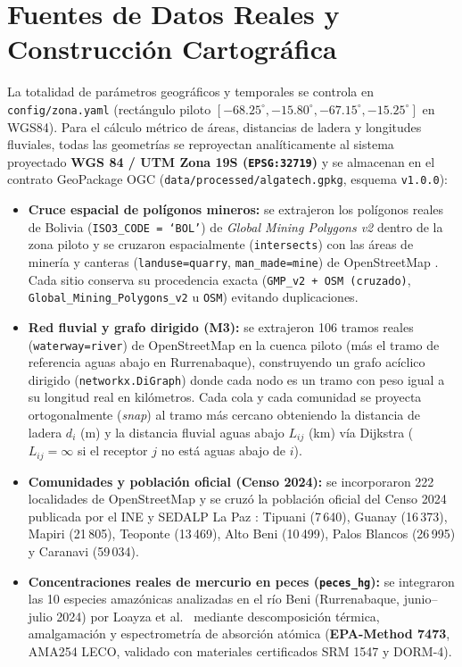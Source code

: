 \documentclass[11pt,a4paper]{article}
\begin{document}
\section{Fuentes de Datos Reales y Construcción Cartográfica}
La totalidad de parámetros geográficos y temporales se controla en \texttt{config/zona.yaml} (rectángulo piloto $[-68.25^\circ, -15.80^\circ, -67.15^\circ, -15.25^\circ]$ en WGS84). Para el cálculo métrico de áreas, distancias de ladera y longitudes fluviales, todas las geometrías se reproyectan analíticamente al sistema proyectado \textbf{WGS 84 / UTM Zona 19S (\texttt{EPSG:32719})} y se almacenan en el contrato GeoPackage OGC (\texttt{data/processed/algatech.gpkg}, esquema \texttt{v1.0.0}):

\begin{itemize}
  \item \textbf{Cruce espacial de polígonos mineros:} se extrajeron los polígonos reales de Bolivia (\texttt{ISO3\_CODE = `BOL'}) de \textit{Global Mining Polygons v2} \cite{maus2022} dentro de la zona piloto y se cruzaron espacialmente (\texttt{intersects}) con las áreas de minería y canteras (\texttt{landuse=quarry}, \texttt{man\_made=mine}) de OpenStreetMap \cite{osm2026}. Cada sitio conserva su procedencia exacta (\texttt{GMP\_v2 + OSM (cruzado)}, \texttt{Global\_Mining\_Polygons\_v2} u \texttt{OSM}) evitando duplicaciones.
  \item \textbf{Red fluvial y grafo dirigido (M3):} se extrajeron 106 tramos reales (\texttt{waterway=river}) de OpenStreetMap en la cuenca piloto (más el tramo de referencia aguas abajo en Rurrenabaque), construyendo un grafo acíclico dirigido (\texttt{networkx.DiGraph}) donde cada nodo es un tramo con peso igual a su longitud real en kilómetros. Cada cola y cada comunidad se proyecta ortogonalmente (\textit{snap}) al tramo más cercano obteniendo la distancia de ladera $d_i$ (m) y la distancia fluvial aguas abajo $L_{ij}$ (km) vía Dijkstra ($L_{ij} = \infty$ si el receptor $j$ no está aguas abajo de $i$).
  \item \textbf{Comunidades y población oficial (Censo 2024):} se incorporaron 222 localidades de OpenStreetMap y se cruzó la población oficial del Censo 2024 publicada por el INE y SEDALP La Paz \cite{ine2024}: Tipuani (7\,640), Guanay (16\,373), Mapiri (21\,805), Teoponte (13\,469), Alto Beni (10\,499), Palos Blancos (26\,995) y Caranavi (59\,034).
  \item \textbf{Concentraciones reales de mercurio en peces (\texttt{peces\_hg}):} se integraron las 10 especies amazónicas analizadas en el río Beni (Rurrenabaque, junio--julio 2024) por Loayza et al.\ \cite{loayza2026} mediante descomposición térmica, amalgamación y espectrometría de absorción atómica (\textbf{EPA-Method 7473}, AMA254 LECO\textregistered, validado con materiales certificados SRM 1547 y DORM-4).
\end{itemize}
\end{document}
